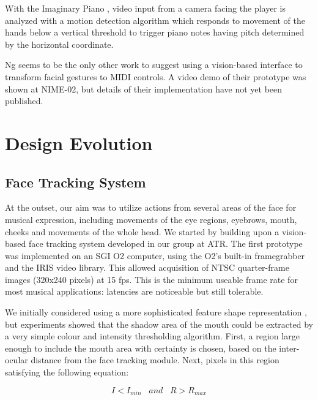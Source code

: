 With the Imaginary Piano \cite{Tarabella:2000}, video input from a camera facing the player is analyzed with a motion detection algorithm which responds to movement of the hands below a vertical threshold to trigger piano notes having pitch determined by the horizontal coordinate.

Ng \cite{Ng:2002} seems to be the only other work to suggest using a vision-based interface to transform facial gestures to MIDI controls. A video demo of their prototype was shown at NIME-02, but details of their implementation have not yet been published.

\section{Design Evolution}
\subsection{Face Tracking System}

At the outset, our aim was to utilize actions from several areas of the face for musical expression, including movements of the eye regions, eyebrows, mouth, cheeks and movements of the whole head. We started by building upon a vision-based face tracking system developed in our group at ATR.  The first prototype was implemented on an SGI O2 computer, using the O2's built-in framegrabber and the IRIS video library. This allowed acquisition of NTSC quarter-frame images (320x240 pixels) at 15 fps. This is the minimum useable frame rate for most musical applications: latencies are noticeable but still tolerable.

We initially considered using a more sophisticated feature shape representation \cite{Lyons:1999,Pantic:2000}, but experiments showed that the shadow area of the mouth could be extracted by a very simple colour and intensity thresholding algorithm. First, a region large enough to include the mouth area with certainty is chosen, based on the inter-ocular distance from the face tracking module. Next, pixels in this region satisfying  the following equation:

%
\begin{equation}
I < I_{min} \; \;  \; and \;  \;  \; R > R_{max}
\end{equation}
%

